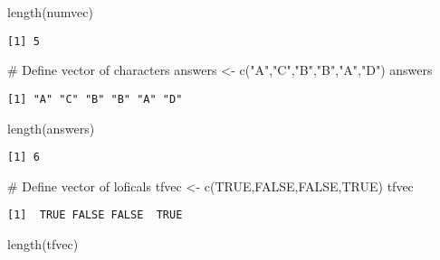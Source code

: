 \documentclass[
  letterpaper,
  DIV=11,
  numbers=noendperiod]{scrartcl}
\newenvironment{Shaded}{\begin{snugshade}}{\end{snugshade}}
\newcommand{\CommentTok}[1]{\textcolor[rgb]{0.37,0.37,0.37}{#1}}
\newcommand{\ConstantTok}[1]{\textcolor[rgb]{0.56,0.35,0.01}{#1}}
\newcommand{\FunctionTok}[1]{\textcolor[rgb]{0.28,0.35,0.67}{#1}}
\newcommand{\NormalTok}[1]{\textcolor[rgb]{0.00,0.23,0.31}{#1}}
\newcommand{\OtherTok}[1]{\textcolor[rgb]{0.00,0.23,0.31}{#1}}
\newcommand{\StringTok}[1]{\textcolor[rgb]{0.13,0.47,0.30}{#1}}
\begin{document}
\begin{Shaded}
\begin{Highlighting}[]
\FunctionTok{length}\NormalTok{(numvec)}
\end{Highlighting}
\end{Shaded}

\begin{verbatim}
[1] 5
\end{verbatim}

\begin{Shaded}
\begin{Highlighting}[]
\CommentTok{\# Define vector of characters}
\NormalTok{answers }\OtherTok{\textless{}{-}} \FunctionTok{c}\NormalTok{(}\StringTok{"A"}\NormalTok{,}\StringTok{"C"}\NormalTok{,}\StringTok{"B"}\NormalTok{,}\StringTok{"B"}\NormalTok{,}\StringTok{"A"}\NormalTok{,}\StringTok{"D"}\NormalTok{)}
\NormalTok{answers}
\end{Highlighting}
\end{Shaded}

\begin{verbatim}
[1] "A" "C" "B" "B" "A" "D"
\end{verbatim}

\begin{Shaded}
\begin{Highlighting}[]
\FunctionTok{length}\NormalTok{(answers)}
\end{Highlighting}
\end{Shaded}

\begin{verbatim}
[1] 6
\end{verbatim}

\begin{Shaded}
\begin{Highlighting}[]
\CommentTok{\# Define vector of loficals}
\NormalTok{tfvec }\OtherTok{\textless{}{-}} \FunctionTok{c}\NormalTok{(}\ConstantTok{TRUE}\NormalTok{,}\ConstantTok{FALSE}\NormalTok{,}\ConstantTok{FALSE}\NormalTok{,}\ConstantTok{TRUE}\NormalTok{)}
\NormalTok{tfvec}
\end{Highlighting}
\end{Shaded}

\begin{verbatim}
[1]  TRUE FALSE FALSE  TRUE
\end{verbatim}

\begin{Shaded}
\begin{Highlighting}[]
\FunctionTok{length}\NormalTok{(tfvec)}
\end{Highlighting}
\end{Shaded}
\end{document}
